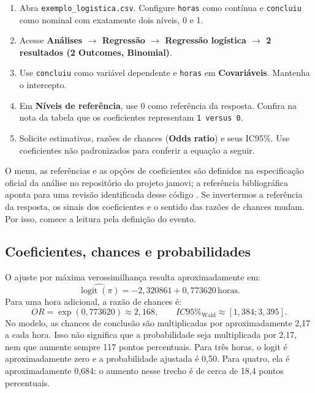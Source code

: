\begin{enumerate}
  \item Abra \texttt{exemplo\_logistica.csv}. Configure \texttt{horas} como contínua e \texttt{concluiu} como nominal com exatamente dois níveis, 0 e 1.
  \item Acesse \textbf{Análises $\rightarrow$ Regressão $\rightarrow$ Regressão logística $\rightarrow$ 2 resultados (2 Outcomes, Binomial)}.
  \item Use \texttt{concluiu} como variável dependente e \texttt{horas} em \textbf{Covariáveis}. Mantenha o intercepto.
  \item Em \textbf{Níveis de referência}, use 0 como referência da resposta. Confira na nota da tabela que os coeficientes representam \texttt{1 versus 0}.
  \item Solicite estimativas, razões de chances (\textbf{Odds ratio}) e seus IC95\%. Use coeficientes não padronizados para conferir a equação a seguir.
\end{enumerate}

O menu, as referências e as opções de coeficientes são definidos na especificação oficial da análise no repositório do projeto jamovi; a referência bibliográfica aponta para uma revisão identificada desse código \parencite{JamoviLogisticaCodigo}. Se invertermos a referência da resposta, os sinais dos coeficientes e o sentido das razões de chances mudam. Por isso, comece a leitura pela definição do evento.

\subsection{Coeficientes, chances e probabilidades}

O ajuste por máxima verossimilhança resulta aproximadamente em:
\[
\widehat{\operatorname{logit}(\pi)}=-2{,}320861
+0{,}773620\,\text{horas}.
\]
Para uma hora adicional, a razão de chances é:
\[
OR=\exp(0{,}773620)\approx2{,}168,
\qquad IC95\%_{\mathrm{Wald}}\approx[1{,}384;3{,}395].
\]
No modelo, as chances de conclusão são multiplicadas por aproximadamente 2,17 a cada hora. Isso não significa que a probabilidade seja multiplicada por 2,17, nem que aumente sempre 117 pontos percentuais. Para três horas, o logit é aproximadamente zero e a probabilidade ajustada é 0,50. Para quatro, ela é aproximadamente 0,684: o aumento nesse trecho é de cerca de 18,4 pontos percentuais.

